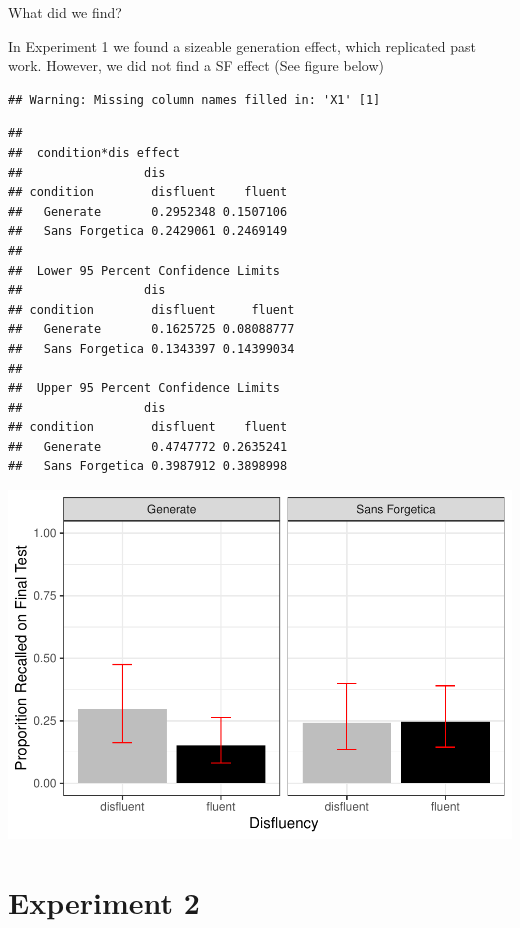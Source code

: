 \documentclass[doc]{apa6}
\begin{document}
What did we find?

In Experiment 1 we found a sizeable generation effect, which replicated past work. However, we did not find a SF effect (See figure below)

\begin{verbatim}
## Warning: Missing column names filled in: 'X1' [1]
\end{verbatim}

\begin{verbatim}
## 
##  condition*dis effect
##                 dis
## condition        disfluent    fluent
##   Generate       0.2952348 0.1507106
##   Sans Forgetica 0.2429061 0.2469149
## 
##  Lower 95 Percent Confidence Limits
##                 dis
## condition        disfluent     fluent
##   Generate       0.1625725 0.08088777
##   Sans Forgetica 0.1343397 0.14399034
## 
##  Upper 95 Percent Confidence Limits
##                 dis
## condition        disfluent    fluent
##   Generate       0.4747772 0.2635241
##   Sans Forgetica 0.3987912 0.3898998
\end{verbatim}

\includegraphics{SF_Paper_files/figure-latex/unnamed-chunk-1-1.pdf}

\hypertarget{experiment-2}{%
\section{Experiment 2}\label{experiment-2}}
\end{document}
